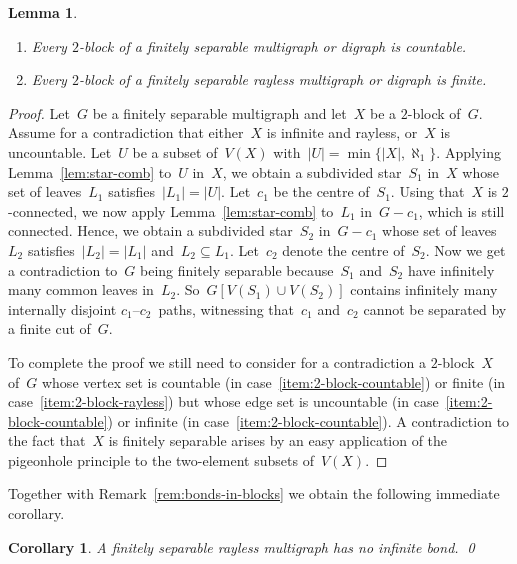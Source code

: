 \documentclass[reqno, 12pt]{amsart}
\numberwithin{equation}{section}
\numberwithin{figure}{section}
\theoremstyle{plain}
\newtheorem{lemma}[thm]{Lemma}
\newtheorem{corollary}[thm]{Corollary}
\theoremstyle{definition}
\newcommand{\abs}[1]{\ensuremath{{\lvert {#1} \rvert}}}
\begin{document}
\begin{lemma}
    \label{lem:2-block}
    \begin{enumerate}
        [label=\textit{(\roman*)}]
        \item \label{item:2-block-countable}
            Every $2$-block of a finitely separable multigraph or digraph is countable.
        \item \label{item:2-block-rayless}
            Every $2$-block of a finitely separable rayless multigraph or digraph is finite.
    \end{enumerate}
\end{lemma}

\begin{proof}
   Let~$G$ be a finitely separable multigraph and let~$X$ be a $2$-block of~$G$. 
   Assume for a contradiction that either~$X$ is infinite and rayless, or~$X$ is uncountable. 
   Let~$U$ be a subset of~$V(X)$ with~${\abs{U} = \min \{ \abs{X}, \aleph_1 \}}$. 
    Applying Lemma~\ref{lem:star-comb} to~$U$ in~$X$, we obtain a subdivided star~$S_1$ in~$X$ whose set of leaves~$L_1$ satisfies~${\abs{L_1} = \abs{U}}$. 
    Let~$c_1$ be the centre of~$S_1$. 
    Using that~$X$ is $2$-connected, we now apply Lemma~\ref{lem:star-comb} to~$L_1$ in~${G-c_1}$, which is still connected. 
    Hence, we obtain a subdivided star~$S_2$ in~${G-c_1}$ whose set of leaves~$L_2$ satisfies~${\abs{L_2} = \abs{L_1}}$ and~${L_2 \subseteq L_1}$. 
    Let~$c_2$ denote the centre of~$S_2$.
    Now we get a contradiction to~$G$ being finitely separable because~$S_1$ and~$S_2$ have infinitely many common leaves in~$L_2$. 
    So~${G[V(S_1) \cup V(S_2)]}$ contains infinitely many internally disjoint $c_1$--$c_2$~paths, witnessing that~$c_1$ and~$c_2$ cannot be separated by a finite cut of~$G$.
    
    To complete the proof we still need to consider for a contradiction a $2$-block~$X$ of~$G$ whose vertex set is countable (in case~\ref{item:2-block-countable}) or finite (in case~\ref{item:2-block-rayless}) but whose edge set is uncountable (in case~\ref{item:2-block-countable}) or infinite (in case~\ref{item:2-block-countable}). 
    A contradiction to the fact that~$X$ is finitely separable arises by an easy application of the pigeonhole principle to the two-element subsets of~${V(X)}$. 
\end{proof}

Together with Remark~\ref{rem:bonds-in-blocks} we obtain the following immediate corollary. 

\begin{corollary}
    \label{cor:fin-sep+rayless=no_inf-bond}
    A finitely separable rayless multigraph has no infinite bond. 
    \qed
\end{corollary}
\end{document}
